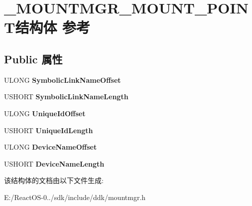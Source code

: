 \hypertarget{struct___m_o_u_n_t_m_g_r___m_o_u_n_t___p_o_i_n_t}{}\section{\+\_\+\+M\+O\+U\+N\+T\+M\+G\+R\+\_\+\+M\+O\+U\+N\+T\+\_\+\+P\+O\+I\+N\+T结构体 参考}
\label{struct___m_o_u_n_t_m_g_r___m_o_u_n_t___p_o_i_n_t}
\subsection*{Public 属性}
\begin{DoxyCompactItemize}
\item 
\mbox{\label{struct___m_o_u_n_t_m_g_r___m_o_u_n_t___p_o_i_n_t_ae0c11282f0efaf827d57b49dc6a755f0}} 
U\+L\+O\+NG {\bfseries Symbolic\+Link\+Name\+Offset}
\item 
\mbox{\label{struct___m_o_u_n_t_m_g_r___m_o_u_n_t___p_o_i_n_t_adf04f1e62a1ad86bcaadff152cac0c7c}} 
U\+S\+H\+O\+RT {\bfseries Symbolic\+Link\+Name\+Length}
\item 
\mbox{\label{struct___m_o_u_n_t_m_g_r___m_o_u_n_t___p_o_i_n_t_abf1ca2e7153832dd057e7a61acb1646e}} 
U\+L\+O\+NG {\bfseries Unique\+Id\+Offset}
\item 
\mbox{\label{struct___m_o_u_n_t_m_g_r___m_o_u_n_t___p_o_i_n_t_a185768e758fa3f691d5a43b4e1cfbba8}} 
U\+S\+H\+O\+RT {\bfseries Unique\+Id\+Length}
\item 
\mbox{\label{struct___m_o_u_n_t_m_g_r___m_o_u_n_t___p_o_i_n_t_a8d732efb1d8a6114edb3b87785a09533}} 
U\+L\+O\+NG {\bfseries Device\+Name\+Offset}
\item 
\mbox{\label{struct___m_o_u_n_t_m_g_r___m_o_u_n_t___p_o_i_n_t_a47c67c96fe875bc163b378bc3832339e}} 
U\+S\+H\+O\+RT {\bfseries Device\+Name\+Length}
\end{DoxyCompactItemize}


该结构体的文档由以下文件生成\+:\begin{DoxyCompactItemize}
\item 
E\+:/\+React\+O\+S-\/0../sdk/include/ddk/mountmgr.\+h\end{DoxyCompactItemize}
